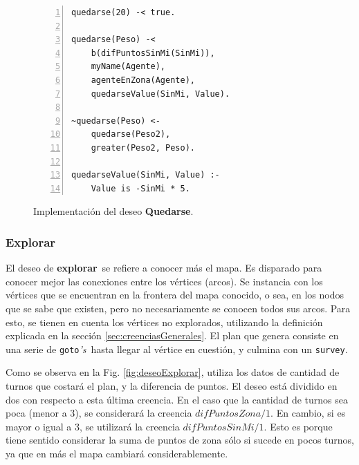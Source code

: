 \documentclass[oneside]{book}
\theoremstyle{definition}
\newcommand{\lit}[1]{\mbox{$ #1$}}
\begin{document}
\begin{figure}
\begin{Verbatim}[numbers=left]
quedarse(20) -< true.

quedarse(Peso) -< 
    b(difPuntosSinMi(SinMi)),
    myName(Agente),
    agenteEnZona(Agente),
    quedarseValue(SinMi, Value).

~quedarse(Peso) <-
    quedarse(Peso2),
    greater(Peso2, Peso).

quedarseValue(SinMi, Value) :-   
    Value is -SinMi * 5.
\end{Verbatim}
\caption{Implementación del deseo \textbf{Quedarse}.}
\label{fig:deseoQuedarse}
\end{figure}


\subsubsection{Explorar}

El deseo de \textbf{explorar}\ se refiere a conocer más el mapa. Es disparado para 
conocer mejor las conexiones entre los vértices (arcos). Se instancia con los vértices
que se encuentran en la frontera del mapa conocido, o sea, en los nodos que se sabe
que existen, pero no necesariamente se conocen todos sus arcos. Para esto, se tienen en 
cuenta los vértices no explorados, utilizando la definición explicada en la 
sección \ref{sec:creenciasGenerales}. El plan que genera 
consiste en una serie de \texttt{goto}\textit{'s}\ hasta llegar al vértice en cuestión, y 
culmina con un \texttt{survey}.



Como se observa en la Fig. \ref{fig:deseoExplorar}, utiliza los datos de cantidad de 
turnos que costará el plan, y la diferencia de puntos.
El deseo está dividido en dos con respecto a esta última creencia. En el caso que la
cantidad de turnos sea poca (menor a 3), se considerará la creencia 
\lit{difPuntosZona/1}. En cambio, si es mayor o igual a 3, se utilizará la creencia
\lit{difPuntosSinMi/1}. Esto es porque tiene sentido considerar la suma de puntos
de zona sólo si sucede en pocos turnos, ya que en más el mapa cambiará 
considerablemente. 
\end{document}
